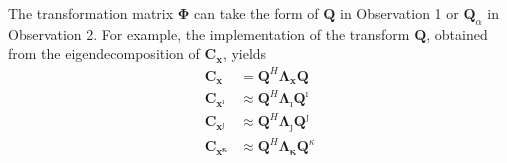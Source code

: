 \documentclass[review]{elsarticle}
\theoremstyle{plain}
\theoremstyle{remark}
\theoremstyle{plain}
\theoremstyle{definition}
\theoremstyle{prop}
\theoremstyle{definition}
\theoremstyle{plain}
\theoremstyle{plain}
\begin{document}
The transformation matrix $\mathbf{\Phi}$ can take the form of $\mathbf{Q}$ in Observation 1 or $\mathbf{Q}_\alpha$ in Observation 2. 
For example, the implementation of the transform $\mathbf{Q}$, obtained from the eigendecomposition of $\mathbf{C}_\mathbf{x}$, yields
\begin{equation}\label{QAUT}
\begin{split}
\mathbf{C}_\mathbf{x}&=\mathbf{Q}^{H}\mathbf{\boldsymbol{\Lambda}}_{\mathbf{x}}\mathbf{Q}\\
\mathbf{C}_\mathbf{x^\imath}&\approx\mathbf{Q}^{H}\mathbf{\boldsymbol{\Lambda}}_{\mathbf{\imath}}\mathbf{Q}^{\imath}\\
\mathbf{C}_\mathbf{x^\jmath}&\approx\mathbf{Q}^{H}\mathbf{\boldsymbol{\Lambda}}_{\mathbf{\jmath}}\mathbf{Q}^{\jmath}\\
\mathbf{C}_\mathbf{x^\kappa}&\approx\mathbf{Q}^{H}\mathbf{\boldsymbol{\Lambda}}_{\mathbf{\kappa}}\mathbf{Q}^{\kappa}
\end{split}
\end{equation}
\end{document}
